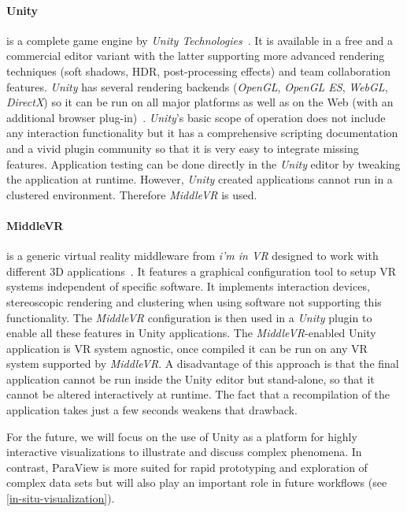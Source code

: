 \documentclass[twocolumn]{svjour3}          %
\begin{document}
\paragraph{Unity}
is a complete game engine by \emph{Unity Technologies}~\cite{goldstone:unity3d}. It is available in a free and a commercial editor variant with the latter supporting more advanced rendering techniques (soft shadows, HDR, post-processing effects) and team collaboration features. \emph{Unity} has several rendering backends (\emph{OpenGL}, \emph{OpenGL ES}, \emph{Web\-GL}, \emph{DirectX}) so it can be run on all major platforms as well as on the Web (with an additional browser plug-in)~\cite{web:unity}. \emph{Unity}'s basic scope of operation does not include any interaction functionality but it has a comprehensive scripting documentation and a vivid plugin community so that it is very easy to integrate missing features. Application testing can be done directly in the \emph{Unity} editor by tweaking the application at runtime. However, \emph{Unity} created applications cannot run in a clustered environment. Therefore \emph{MiddleVR} is used.

\paragraph{MiddleVR}
is a generic virtual reality middleware from \emph{i'm in VR} designed to work with different 3D applications~\cite{web:middlevr}. It features a graphical configuration tool to setup VR systems independent of specific software. It implements interaction devices, stereoscopic rendering and clustering when using software not supporting this functionality. The \emph{MiddleVR} configuration is then used in a \emph{Unity} plugin to enable all these features in Unity applications. The \emph{MiddleVR}-enabled Unity application is VR system agnostic, once compiled it can be run on any VR system supported by \emph{MiddleVR}. A disadvantage of this approach is that the final application cannot be run inside the Unity editor but stand-alone, so that it cannot be altered interactively at runtime. The fact that a recompilation of the application takes just a few seconds weakens that drawback.

For the future, we will focus on the use of Unity as a platform for highly interactive visualizations to illustrate and discuss complex phenomena. In contrast, ParaView is more suited for rapid prototyping and exploration of complex data sets but will also play an important role in future workflows (see \ref{in-situ-visualization}).
\end{document}
